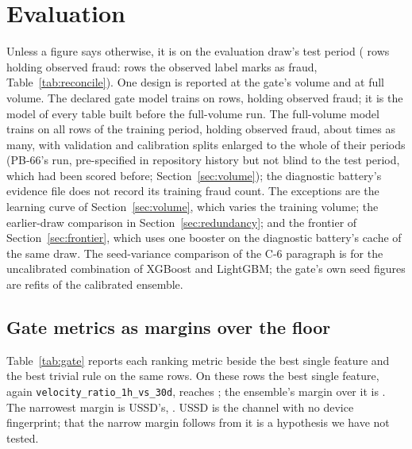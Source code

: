 \section{Evaluation}
\label{sec:evaluation}

Unless a figure says otherwise, it is on the evaluation draw's test period (\nTestRows{} rows
holding \nTestFraud{} observed fraud: rows the observed label marks as fraud, Table~\ref{tab:reconcile}). One design is reported at the gate's volume and at full volume. The declared
gate model trains on \nTrainUsed{} rows, holding \nGateTrainFraud{} observed fraud; it is the model
of every table built before the full-volume run. The full-volume model
trains on all \nFvTrainRows{} rows of the training period, holding \nFvTrainFraud{} observed
fraud, about \nFullVolumeFactor{} times as many, with validation and calibration splits enlarged
to the whole of their periods (PB-66's run, pre-specified in repository history but not blind to the
test period, which had been scored before; Section~\ref{sec:volume}); the diagnostic battery's evidence file does
not record its training fraud count. The exceptions are the learning curve of
Section~\ref{sec:volume}, which varies the training volume; the earlier-draw comparison in
Section~\ref{sec:redundancy}; and the frontier of Section~\ref{sec:frontier}, which uses one
booster on the diagnostic battery's cache of the same draw. The seed-variance comparison of the
C-6 paragraph is for the uncalibrated combination of XGBoost and LightGBM; the gate's own seed
figures are refits of the calibrated ensemble.

\subsection{Gate metrics as margins over the floor}

Table~\ref{tab:gate} reports each ranking metric beside the best single feature and the best
trivial rule on the same rows. On these rows the best single feature, again
\texttt{velocity\_ratio\_1h\_vs\_30d}, reaches \nGateFloor{}; the ensemble's margin over it is
\nGateMargin{}. The narrowest margin is USSD's, \nGateUSSDMargin{}. USSD is the channel with no
device fingerprint; that the narrow margin follows from it is a hypothesis we have not tested.

